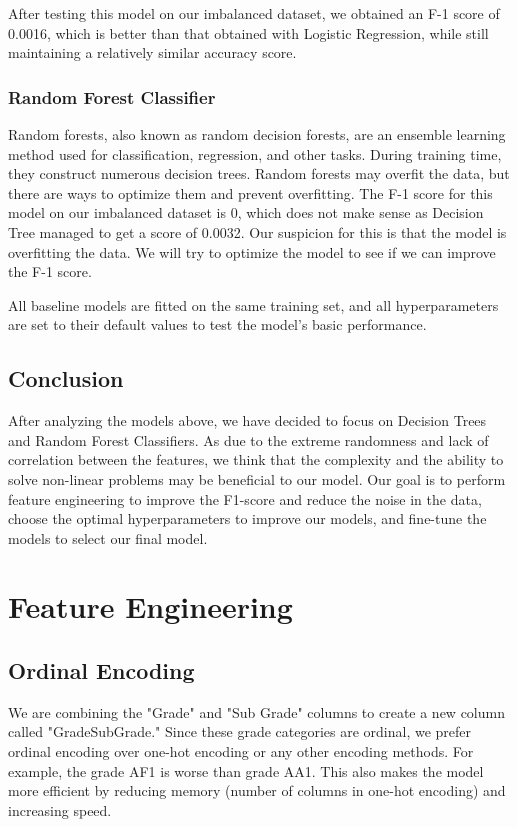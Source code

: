 \documentclass[sigplan]{acmart}
\begin{document}
After testing this model on our imbalanced dataset, we obtained an F-1 score of 0.0016, which is better than that obtained with Logistic Regression, while still maintaining a relatively similar accuracy score.

\subsubsection{Random Forest Classifier}
Random forests, also known as random decision forests, are an ensemble learning method used for classification, regression, and other tasks. During training time, they construct numerous decision trees. Random forests may overfit the data, but there are ways to optimize them and prevent overfitting.
The F-1 score for this model on our imbalanced dataset is 0, which does not make sense as Decision Tree managed to get a score of 0.0032. Our suspicion for this is that the model is overfitting the data. We will try to optimize the model to see if we can improve the F-1 score.

All baseline models are fitted on the same training set, and all hyperparameters are set to their default values to test the model's basic performance.

\subsection{Conclusion}
After analyzing the models above, we have decided to focus on Decision Trees and Random Forest Classifiers. As due to the extreme randomness and lack of correlation between the features, we think that the complexity and the ability to solve non-linear problems may be beneficial to our model. Our goal is to perform feature engineering to improve the F1-score and reduce the noise in the data, choose the optimal hyperparameters to improve our models, and fine-tune the models to select our final model.

\section{Feature Engineering}
\subsection{Ordinal Encoding}
We are combining the "Grade" and "Sub Grade" columns to create a new column called "GradeSubGrade." Since these grade categories are ordinal, we prefer ordinal encoding over one-hot encoding or any other encoding methods. For example, the grade AF1 is worse than grade AA1. This also makes the model more efficient by reducing memory (number of columns in one-hot encoding) and increasing speed.
\end{document}

